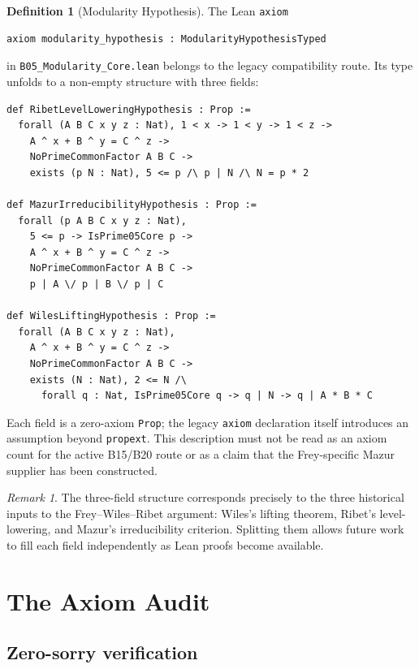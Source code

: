\documentclass[12pt,reqno]{amsart}
\theoremstyle{plain}
\theoremstyle{definition}
\newtheorem{definition}[theorem]{Definition}
\theoremstyle{remark}
\newtheorem{remark}[theorem]{Remark}
\begin{document}
\begin{definition}[Modularity Hypothesis]
The Lean \texttt{axiom}
\begin{lstlisting}
axiom modularity_hypothesis : ModularityHypothesisTyped
\end{lstlisting}
in \texttt{B05\_Modularity\_Core.lean} belongs to the legacy compatibility
route. Its type unfolds to a non-empty structure with three fields:
\begin{lstlisting}
def RibetLevelLoweringHypothesis : Prop :=
  forall (A B C x y z : Nat), 1 < x -> 1 < y -> 1 < z ->
    A ^ x + B ^ y = C ^ z ->
    NoPrimeCommonFactor A B C ->
    exists (p N : Nat), 5 <= p /\ p | N /\ N = p * 2

def MazurIrreducibilityHypothesis : Prop :=
  forall (p A B C x y z : Nat),
    5 <= p -> IsPrime05Core p ->
    A ^ x + B ^ y = C ^ z ->
    NoPrimeCommonFactor A B C ->
    p | A \/ p | B \/ p | C

def WilesLiftingHypothesis : Prop :=
  forall (A B C x y z : Nat),
    A ^ x + B ^ y = C ^ z ->
    NoPrimeCommonFactor A B C ->
    exists (N : Nat), 2 <= N /\
      forall q : Nat, IsPrime05Core q -> q | N -> q | A * B * C
\end{lstlisting}
Each field is a zero-axiom \texttt{Prop}; the legacy \texttt{axiom}
declaration itself introduces an assumption beyond \texttt{propext}.  This
description must not be read as an axiom count for the active B15/B20 route or
as a claim that the Frey-specific Mazur supplier has been constructed.
\end{definition}

\begin{remark}
The three-field structure corresponds precisely to the three
historical inputs to the Frey--Wiles--Ribet argument:
Wiles's lifting theorem, Ribet's level-lowering, and Mazur's
irreducibility criterion. Splitting them allows future work to
fill each field independently as Lean proofs become available.
\end{remark}

\section{The Axiom Audit}
\label{sec:audit}

\subsection{Zero-sorry verification}
\end{document}
